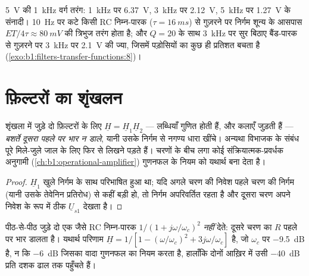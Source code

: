 \begin{example}[आँकड़े]\label{ex:b1:filters-transfer-functions:numbers}
 \qty{5}{V} की \qty{1}{kHz} वर्ग तरंग: \qty{1}{kHz} पर
\qty{6.37}{V}, \qty{3}{kHz} पर \qty{2.12}{V},
\qty{5}{kHz} पर \qty{1.27}{V} के संनादी। \qty{10}{Hz} पर कटे किसी RC
निम्न-पारक ($\tau = \qty{16}{ms}$) से गुज़रने पर निर्गम शून्य के आसपास
 $ET/4\tau \approx \qty{80}{mV}$ की त्रिभुज तरंग होता है; और $Q = 20$ के
साथ \qty{3}{kHz} पर सुर बिठाए बैंड-पारक से गुज़रने पर \qty{3}{kHz} पर
\qty{2.1}{V} की ज्या, जिसमें पड़ोसियों का कुछ ही प्रतिशत बचता है
(\cref{exo:b1:filters-transfer-functions:8})।
\end{example}

\section{फ़िल्टरों का शृंखलन}

\begin{proposition}[शृंखलन और भार-प्रभाव]\label{prop:b1:filters-transfer-functions:cascade}
शृंखला में जुड़े दो फ़िल्टरों के लिए $\underline H = \underline H_1\underline H_2$
--- लब्धियाँ गुणित होती हैं,  और कलाएँ जुड़ती हैं --- \emph{बशर्ते दूसरा
पहले पर भार न डाले}, यानी उसके निर्गम से नगण्य धारा खींचे। अन्यथा विभाजक के
संबंध पूरे मिले-जुले जाल के लिए फिर से लिखने पड़ते हैं। चरणों के बीच लगा कोई
संक्रियात्मक-प्रवर्धक अनुगामी
(\cref{ch:b1:operational-amplifier}) गुणनफल के नियम को यथार्थ बना देता है।
\end{proposition}

\begin{proof}
$\underline H_1$ खुले निर्गम के साथ परिभाषित हुआ था; यदि अगले चरण की
निवेश  पहले चरण की निर्गम  (यानी उसके तेवेनिन प्रतिरोध)
से कहीं बड़ी हो, तो निर्गम  अपरिवर्तित रहता है और
दूसरा चरण अपने निवेश के रूप में ठीक $\underline U_{s1}$ देखता है।
\end{proof}

\begin{example}[दो RC चरण]\label{ex:b1:filters-transfer-functions:tworc}
पीठ-से-पीठ जुड़े दो एक जैसे RC निम्न-पारक
$1/(1 + j\omega/\omega_c)^2$ \emph{नहीं} देते: दूसरे चरण का $R$ पहले पर भार
डालता है। यथार्थ परिणाम $\underline H = 1/[1 - (\omega/\omega_c)^2 +
3j\omega/\omega_c]$ है, जो $\omega_c$ पर \qty{-9.5}{dB} है, न कि
\qty{-6}{dB} जिसका वादा गुणनफल का नियम करता है, हालाँकि दोनों आख़िर में उसी
\qty{-40}{dB} प्रति दशक ढाल तक पहुँचते हैं।
\end{example}

